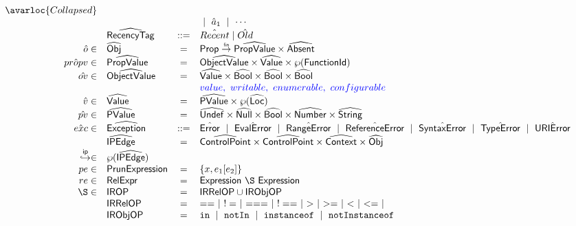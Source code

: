 \[\begin{array}{rlcl}
                           \avarloc{Collapsed} \\
                    & & & ~\mid~
                           \hat{a}_1 ~\mid~ \cdots \\
			& \abs{RecencyTag} & ::= & \hat{Recent} \mid \hat{Old}\\
\hat{o} \in & \aObj & = & \SF{Prop} \finto \abs{PropValue} \times \abs{Absent}\\
\hat{propv} \in & \abs{PropValue} & = & \abs{ObjectValue} \times \aValue \times \powerset{\fid} \\
\hat{ov}\in & \abs{ObjectValue} & = & \aValue \times \abs{Bool} \times \abs{Bool} \times \abs{Bool} \\
            &                   &   & {\inblue value,\ writable,\ enumerable,\ configurable} \\
\hat{v} \in & \aValue & = & \abs{PValue} \times \powerset{\aLoc} \\
\hat{pv}\in & \abs{PValue} & = & \abs{Undef} \times \abs{Null} \times \abs{Bool} \times \abs{Number} \times \abs{String} \\
\hat{exc}\in& \abs{Exception} & ::= & \hat{\exc{Error}} ~\mid~ \hat{\exc{EvalError}} ~\mid~
                                      \hat{\exc{RangeError}} ~\mid~ \hat{\exc{ReferenceError}} ~\mid~
                                      \hat{\exc{SyntaxError}} ~\mid~ \hat{\exc{TypeError}} ~\mid~ 
                                      \hat{\exc{URIError}} \\
            & \abs{IPEdge} & = & \aControlPoint \times \aControlPoint \times \abs{Context} \times \abs{Obj} \\
\ipnext \in & \powerset{\abs{IPEdge}} & &\\


pe \in & \SF{PrunExpression} & = & \{x, e_1[ e_2 ]\}\\
re \in & \SF{RelExpr} & = & \SF{Expression} ~\rel ~ \SF{Expression} \\
\rel \in & \SF{IROP} & = & \SF{IRRelOP} \cup \SF{IRObjOP} \\
& \SF{IRRelOP} & = &  == ~\mid~ != ~\mid~ === ~\mid~ !== ~\mid~ > ~\mid~ >= ~\mid~ < ~\mid~ <= ~\mid\\
& \SF{IRObjOP} & = & \TT{in} ~\mid~ \TT{notIn} ~\mid~ \TT{instanceof} ~\mid~ \TT{notInstanceof}\\



\end{array}
\]

